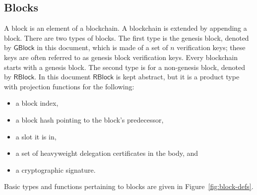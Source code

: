 \documentclass[11pt,a4paper]{article}
\newcommand{\type}[1]{\mathsf{#1}}
\newcommand{\GBlock}{\type{GBlock}}
\newcommand{\RBlock}{\type{RBlock}}
\begin{document}
\subsection{Blocks}
\label{sec:blocks}

A block is an element of a blockchain.
%
A blockchain is extended by appending a block.
%
There are two types of blocks.
%
The first type is the genesis block, denoted by $\GBlock$ in this document,
which is made of a set of $n$ verification keys;
%
these keys are often referred to as genesis block verification keys.
%
Every blockchain starts with a genesis block.
%
The second type is for a non-genesis block, denoted by $\RBlock$.
%
In this document $\RBlock$ is kept abstract, but it is a product type with
projection functions for the following:
%
\begin{itemize}
\item a block index,
\item a block hash pointing to the block's predecessor,
\item a slot it is in,
\item a set of heavyweight delegation certificates in the body, and
\item a cryptographic signature.
\end{itemize}


Basic types and functions pertaining to blocks are given in
Figure~\ref{fig:block-defs}.
\end{document}
